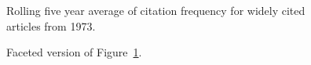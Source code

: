 \documentclass[
  10pt,
  letterpaper,
  DIV=11,
  numbers=noendperiod,
  twoside]{scrartcl}
\begin{document}
\begin{figure}


\caption{\label{fig-citation-spaghetti-1973}Rolling five year average of
citation frequency for widely cited articles from 1973.}

\end{figure}%

\begin{figure}


\caption{\label{fig-citation-facet-1973}Faceted version of
Figure~\ref{fig-citation-spaghetti-1973}.}

\end{figure}%
\end{document}
